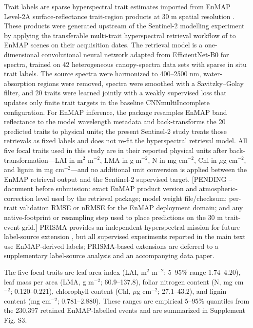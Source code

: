 \documentclass[final,times,onecolumn, authoryear]{elsarticle}
\begin{document}
\begin{linenumbers}
Trait labels are sparse hyperspectral trait estimates imported from EnMAP Level-2A surface-reflectance trait-region products at 30 m spatial resolution \citep{guanter2015enmap}. These products were generated upstream of the Sentinel-2 modelling experiment by applying the transferable multi-trait hyperspectral retrieval workflow of \citet{cherif2023spectra} to EnMAP scenes on their acquisition dates. The retrieval model is a one-dimensional convolutional neural network adapted from EfficientNet-B0 for spectra, trained on 42 heterogeneous canopy-spectra data sets with sparse in situ trait labels. The source spectra were harmonized to 400--2500 nm, water-absorption regions were removed, spectra were smoothed with a Savitzky--Golay filter, and 20 traits were learned jointly with a weakly supervised loss that updates only finite trait targets in the baseline CNNmultiIncomplete configuration. For EnMAP inference, the package resamples EnMAP band reflectance to the model wavelength metadata and back-transforms the 20 predicted traits to physical units; the present Sentinel-2 study treats those retrievals as fixed labels and does not re-fit the hyperspectral retrieval model. All five focal traits used in this study are in their reported physical units after back-transformation---LAI in m$^2$ m$^{-2}$, LMA in g m$^{-2}$, N in mg cm$^{-2}$, Chl in $\mu$g cm$^{-2}$, and lignin in mg cm$^{-2}$---and no additional unit conversion is applied between the EnMAP retrieval output and the Sentinel-2 supervised target. [PENDING -- document before submission: exact EnMAP product version and atmospheric-correction level used by the retrieval package; model weight file/checksum; per-trait validation RMSE or nRMSE for the EnMAP deployment domain; and any native-footprint or resampling step used to place predictions on the 30 m trait-event grid.] PRISMA provides an independent hyperspectral mission for future label-source extension \citep{cogliati2021prisma}, but all supervised experiments reported in the main text use EnMAP-derived labels; PRISMA-based extensions are deferred to a supplementary label-source analysis and an accompanying data paper.

The five focal traits are leaf area index (LAI, m$^2$ m$^{-2}$; 5--95\% range 1.74--4.20), leaf mass per area (LMA, g m$^{-2}$; 60.9--137.8), foliar nitrogen content (N, mg cm$^{-2}$; 0.120--0.221), chlorophyll content (Chl, $\mu$g cm$^{-2}$; 27.1--43.2), and lignin content (mg cm$^{-2}$; 0.781--2.880). These ranges are empirical 5--95\% quantiles from the 230,397 retained EnMAP-labelled events and are summarized in Supplement Fig. S3.


\end{linenumbers}
\end{document}
